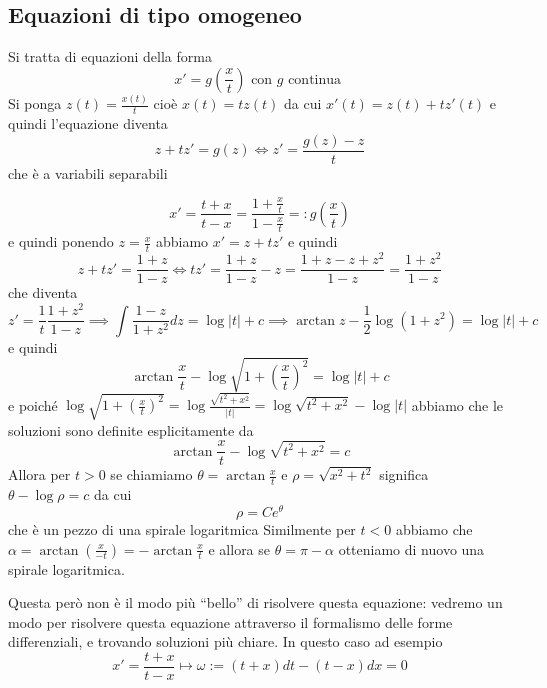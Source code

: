 \subsection{Equazioni di tipo omogeneo}
Si tratta di equazioni della forma
\[
    x ' = g{\left( \frac{x}{t} \right)}  \text{ con \(g\) continua } 
\]
Si ponga \(z{(t)} = {\frac{x{(t)}}{t}}\) cioè \(x{(t)} = tz{(t)}\) da cui
\(x'{(t)} = z{(t)} + tz'{(t)}\) e quindi l'equazione diventa
\[
    z + tz' = g{(z)} \iff z' = \frac{g{(z)} - z}{t}
\]
che è a variabili separabili
\begin{example}
    \[
        x' = \frac{t + x}{t - x} = \frac{1 + \frac{x}{t}}{1 - \frac{x}{t}} =:
        g{\left( \frac{x}{t} \right)} 
    \]
    e quindi ponendo \(z = \frac{x}{t}\) abbiamo \(x' = z + tz'\) e quindi
    \[
        z + tz' = \frac{1 + z}{1 - z} \iff tz' = \frac{1+z}{1-z} - z = \frac{1+
        z - z + z^2}{1 - z} = \frac{1 + z^2}{1 -z}
    \]
    che diventa
    \[
        z' = \frac{1}{t}\frac{1 + z^2}{1-z} \implies  \int \frac{1-z}{1 + z^2} dz =
        \log|t| + c \implies  \arctan z - \frac{1}{2}\log{(1+z^2)} = \log|t| + c
    \]
    e quindi
    \[
        \arctan \frac{x}{t} - \log{\sqrt{1+{\left( \frac{x}{t} \right)} ^2}} =
        \log|t| + c
    \]
    e poiché \(\log{\sqrt{1 + {\left( \frac{x}{t} \right)}^2 }} = \log
    \frac{\sqrt{t^2+x^2}}{|t|} = \log \sqrt{t^2+x^2} - \log|t|\) abbiamo che le
    soluzioni sono definite esplicitamente da
    \[
        \arctan \frac{x}{t} - \log \sqrt{t^2+x^2} = c
    \]
    Allora per \(t > 0\) se chiamiamo \(\theta = \arctan \frac{x}{t}\) e \(\rho
    = \sqrt{x^2 + t^2}\) significa \(\theta - \log \rho = c\) da cui
    \[
        \rho = C e^{\theta}
    \]
    che è un pezzo di una spirale logaritmica
    Similmente per \(t < 0\) abbiamo che \(\alpha = \arctan{\left( \frac{x}{-t}
    \right)} = - \arctan \frac{x}{t}\) e allora se \(\theta = \pi - \alpha\)
    otteniamo di nuovo una spirale logaritmica.

    Questa però non è il modo più ``bello'' di risolvere questa equazione:
    vedremo un modo per risolvere questa equazione attraverso il formalismo
    delle forme differenziali, e trovando soluzioni più chiare. In questo caso
    ad esempio
    \[
        x' = \frac{t + x}{ t- x } \mapsto \omega := {(t + x)}dt - {(t - x)}dx = 0 
    \]
\end{example}

